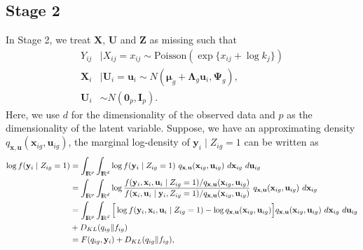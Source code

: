 \documentclass[12pt]{article}
\newcommand{\real}{\text{\rm I\hspace{-0.6mm}R}}
\newcommand{\bI}{\mathbf{I}}
\newcommand{\bU}{\mathbf{U}}
\newcommand{\bX}{\mathbf{X}}
\newcommand{\bZ}{\mathbf{Z}}
\newcommand{\bu}{\mathbf{u}}
\newcommand{\bx}{\mathbf{x}}
\newcommand{\by}{\mathbf{y}}
\newcommand{\bmu}{\boldsymbol{\mu}}
\newcommand{\bLambda}{\boldsymbol{\Lambda}}
\newcommand{\bPsi}{\boldsymbol{\Psi}}
\begin{document}
\subsection{Stage 2}
In Stage 2, we treat $\bX$, $\bU$ and $\bZ$ as missing such that
\begin{align*}
Y_{ij}&\mid X_{ij}=x_{ij}\sim \text{Poisson}\left(\exp\{x_{ij}+\log{k_j}\}\right)\\
\bX_i&\mid \bU_i=\bu_i\sim N(\bmu_g+\bLambda_g \bu_i,\bPsi_g),\\
\bU_i&\sim N(\mathbf{0}_p,\bI_p).
\end{align*}
Here, we use $d$ for the dimensionality of the observed data and $p$ as the dimensionality of the latent variable.
Suppose, we have an approximating density $q_{\bx,\bu}(\bx_{ig},\bu_{ig})$, the marginal log-density of $\by_i\mid Z_{ig}=1$ can be written as
\begin{align*}
\log f(\by_i\mid Z_{ig}=1) &= \int_{\real^p} \int_{\real^d} \log f(\by_i\mid Z_{ig}=1) ~q_{\bx,\bu}(\bx_{ig},\bu_{ig}) ~d\bx_{ig}~d\bu_{ig}\\
&= \int_{\real^p} \int_{\real^d} \log \frac{f(\by_i,\bx_i,\bu_i\mid Z_{ig}=1)/q_{\bx,\bu}(\bx_{ig},\bu_{ig})}{f(\bx_i,\bu_i\mid\by_i,Z_{ig}=1)/q_{\bx,\bu}(\bx_{ig},\bu_{ig})} ~q_{\bx,\bu}(\bx_{ig},\bu_{ig}) ~d\bx_{ig}\\
&= \int_{\real^p} \int_{\real^d} \Big[\log f(\by_i,\bx_i,\bu_i\mid Z_{ig}=1) - \log q_{\bx,\bu}(\bx_{ig},\bu_{ig})\Big] q_{\bx,\bu}(\bx_{ig},\bu_{ig}) ~ d\bx_{ig} ~d\bu_{ig}\\
&+ D_{KL}(q_{ig}\|f_{ig}) \\
&= F(q_{ig},\by_i) + D_{KL}(q_{ig}\|f_{ig}),
\end{align*}
\end{document}
